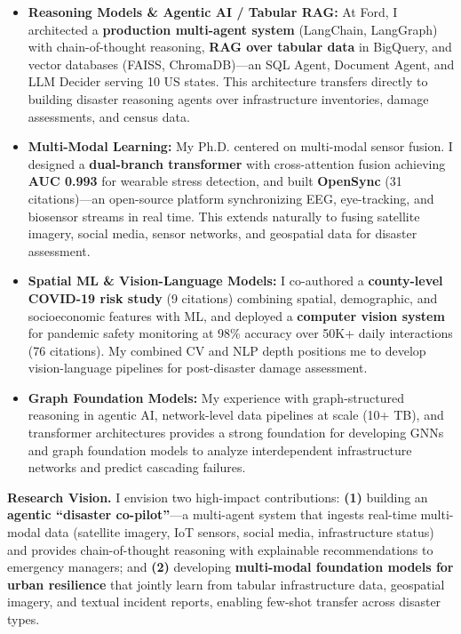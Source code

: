 \documentclass[11pt,letterpaper]{article}
\begin{document}
\begin{itemize}[leftmargin=0.4cm, itemsep=0.12em, topsep=0.1em, parsep=0em, label={\color{headerblue}\textbullet}]
  \item \textbf{Reasoning Models \& Agentic AI / Tabular RAG:} At Ford, I architected a \textbf{production multi-agent system} (LangChain, LangGraph) with chain-of-thought reasoning, \textbf{RAG over tabular data} in BigQuery, and vector databases (FAISS, ChromaDB)---an SQL Agent, Document Agent, and LLM Decider serving 10 US states. This architecture transfers directly to building disaster reasoning agents over infrastructure inventories, damage assessments, and census data.

  \item \textbf{Multi-Modal Learning:} My Ph.D. centered on multi-modal sensor fusion. I designed a \textbf{dual-branch transformer} with cross-attention fusion achieving \textbf{AUC 0.993} for wearable stress detection, and built \textbf{OpenSync} (31 citations)---an open-source platform synchronizing EEG, eye-tracking, and biosensor streams in real time. This extends naturally to fusing satellite imagery, social media, sensor networks, and geospatial data for disaster assessment.

  \item \textbf{Spatial ML \& Vision-Language Models:} I co-authored a \textbf{county-level COVID-19 risk study} (9 citations) combining spatial, demographic, and socioeconomic features with ML, and deployed a \textbf{computer vision system} for pandemic safety monitoring at 98\% accuracy over 50K+ daily interactions (76 citations). My combined CV and NLP depth positions me to develop vision-language pipelines for post-disaster damage assessment.

  \item \textbf{Graph Foundation Models:} My experience with graph-structured reasoning in agentic AI, network-level data pipelines at scale (10+ TB), and transformer architectures provides a strong foundation for developing GNNs and graph foundation models to analyze interdependent infrastructure networks and predict cascading failures.
\end{itemize}

\vspace{-0.1em}

\noindent\textbf{\color{headerblue}Research Vision.}\enspace
I envision two high-impact contributions: \textbf{(1)} building an \textbf{agentic ``disaster co-pilot''}---a multi-agent system that ingests real-time multi-modal data (satellite imagery, IoT sensors, social media, infrastructure status) and provides chain-of-thought reasoning with explainable recommendations to emergency managers; and \textbf{(2)} developing \textbf{multi-modal foundation models for urban resilience} that jointly learn from tabular infrastructure data, geospatial imagery, and textual incident reports, enabling few-shot transfer across disaster types.
\end{document}
